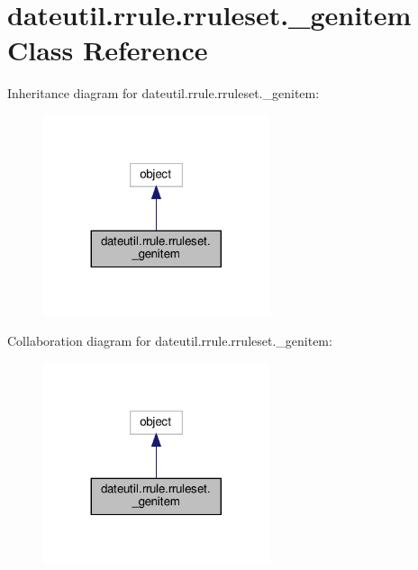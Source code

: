 \hypertarget{classdateutil_1_1rrule_1_1rruleset_1_1__genitem}{}\section{dateutil.\+rrule.\+rruleset.\+\_\+genitem Class Reference}
\label{classdateutil_1_1rrule_1_1rruleset_1_1__genitem}


Inheritance diagram for dateutil.\+rrule.\+rruleset.\+\_\+genitem\+:
\nopagebreak
\begin{figure}[H]
\begin{center}
\leavevmode
\includegraphics[width=188pt]{classdateutil_1_1rrule_1_1rruleset_1_1__genitem__inherit__graph}
\end{center}
\end{figure}


Collaboration diagram for dateutil.\+rrule.\+rruleset.\+\_\+genitem\+:
\nopagebreak
\begin{figure}[H]
\begin{center}
\leavevmode
\includegraphics[width=188pt]{classdateutil_1_1rrule_1_1rruleset_1_1__genitem__coll__graph}
\end{center}
\end{figure}
